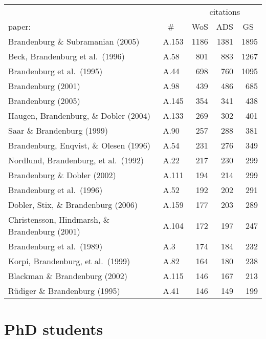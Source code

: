 \documentclass{article}
\begin{document}
\begin{tabular}{llrrr}
      &    & \multicolumn{3}{c}{citations}\\
paper:& $\;\;$\# & WoS & ADS & GS~ \\
\hline        
Brandenburg \& Subramanian (2005)              & A.153 &1186 &1381 &1895 \\
Beck, Brandenburg et al.\ (1996)               & A.58  & 801 & 883 &1267 \\
Brandenburg et al.\ (1995)                     & A.44  & 698 & 760 &1095 \\
Brandenburg (2001)                             & A.98  & 439 & 486 & 685 \\
Brandenburg (2005)                             & A.145 & 354 & 341 & 438 \\
Haugen, Brandenburg, \& Dobler (2004)          & A.133 & 269 & 302 & 401 \\
Saar \& Brandenburg (1999)                     & A.90  & 257 & 288 & 381 \\
Brandenburg, Enqvist, \& Olesen (1996)         & A.54  & 231 & 276 & 349 \\
Nordlund, Brandenburg, et al.\ (1992)          & A.22  & 217 & 230 & 299 \\
Brandenburg \& Dobler (2002)                   & A.111 & 194 & 214 & 299 \\
Brandenburg et al.\ (1996)                     & A.52  & 192 & 202 & 291 \\
Dobler, Stix, \& Brandenburg (2006)            & A.159 & 177 & 203 & 289 \\
Christensson, Hindmarsh, \& Brandenburg (2001) & A.104 & 172 & 197 & 247 \\
Brandenburg et al.\ (1989)                     & A.3   & 174 & 184 & 232 \\
Korpi, Brandenburg, et al.\ (1999)             & A.82  & 164 & 180 & 238 \\
Blackman \& Brandenburg (2002)                 & A.115 & 146 & 167 & 213 \\
R\"udiger \& Brandenburg (1995)                & A.41  & 146 & 149 & 199 \\
\end{tabular}
\vspace{2mm}

\section*{PhD students}
\end{document}
